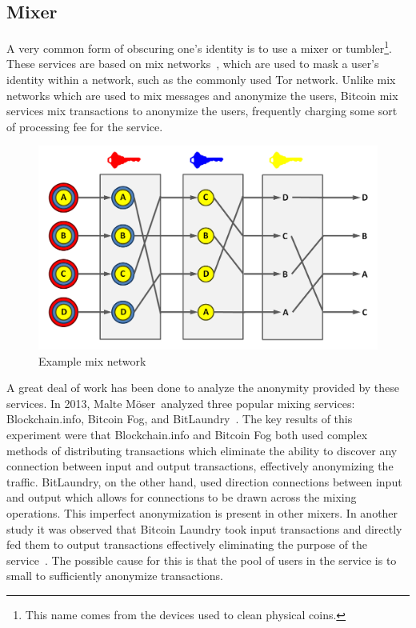 \documentclass[11pt]{article}
\newcommand{\Moser}{M{\"o}ser}
\begin{document}
\subsection{Mixer}
A very common form of obscuring one's identity is to use a mixer or tumbler\footnote{This name comes from the devices
used to clean physical coins.}.  These services are based on mix networks~\cite{chaum81}, which are used to mask a
user's identity within a network, such as the commonly used Tor network.  Unlike mix networks which are used to mix
messages and anonymize the users, Bitcoin mix services mix transactions to anonymize the users, frequently charging some
sort of processing fee for the service.

\begin{figure}[H]
    \caption[Example mix network]{Example mix network\protect\footnotemark}
    \centering
    \includegraphics[width=.8\linewidth]{figures/mix.png}
\end{figure}


A great deal of work has been done to analyze the anonymity provided by these services.  In 2013, Malte \Moser~analyzed
three popular mixing services: Blockchain.info, Bitcoin Fog, and BitLaundry~\cite{moser13}. The key results of this
experiment were that Blockchain.info and Bitcoin Fog both used complex methods of distributing transactions which
eliminate the ability to discover any connection between input and output transactions, effectively anonymizing the
traffic.  BitLaundry, on the other hand, used direction connections between input and output which allows for
connections to be drawn across the mixing operations.  This imperfect anonymization is present in other mixers. In
another study it was observed that Bitcoin Laundry took input transactions and directly fed them to output transactions
effectively eliminating the purpose of the service~\cite{meiklejohn13}. The possible cause for this is that the pool of
users in the service is to small to sufficiently anonymize transactions.
\end{document}
